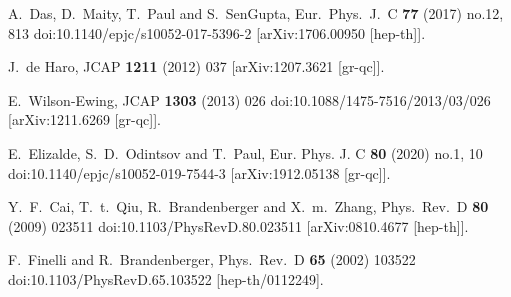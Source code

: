 \documentclass{article}
\begin{document}
\begin{thebibliography}{99}
A.~Das, D.~Maity, T.~Paul and S.~SenGupta,
Eur.\ Phys.\ J.\ C {\bf 77} (2017) no.12,  813
doi:10.1140/epjc/s10052-017-5396-2
[arXiv:1706.00950 [hep-th]].




J.~de Haro,
JCAP {\bf 1211} (2012) 037
[arXiv:1207.3621 [gr-qc]].










E.~Wilson-Ewing,
JCAP {\bf 1303} (2013) 026
doi:10.1088/1475-7516/2013/03/026
[arXiv:1211.6269 [gr-qc]].

E.~Elizalde, S.~D.~Odintsov and T.~Paul,
Eur. Phys. J. C \textbf{80} (2020) no.1, 10
doi:10.1140/epjc/s10052-019-7544-3
[arXiv:1912.05138 [gr-qc]].





  Y.~F.~Cai, T.~t.~Qiu, R.~Brandenberger and X.~m.~Zhang,
  Phys.\ Rev.\ D {\bf 80} (2009) 023511
  doi:10.1103/PhysRevD.80.023511
  [arXiv:0810.4677 [hep-th]].




F.~Finelli and R.~Brandenberger,
Phys.\ Rev.\ D {\bf 65} (2002) 103522
doi:10.1103/PhysRevD.65.103522
[hep-th/0112249].



\end{thebibliography}
\end{document}

